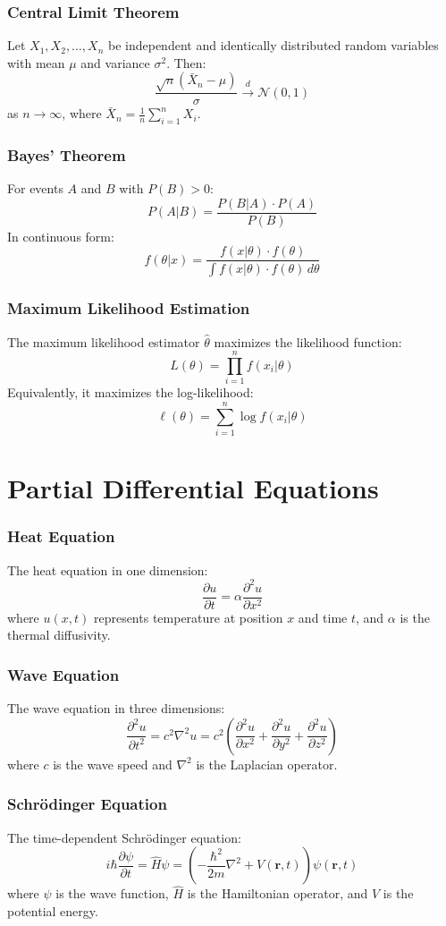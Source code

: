 \documentclass{beamer}
\begin{document}
\begin{frame}
\frametitle{Central Limit Theorem}
Let $X_1, X_2, \ldots, X_n$ be independent and identically distributed random variables with mean $\mu$ and variance $\sigma^2$. Then:
\[
\frac{\sqrt{n}(\bar{X}_n - \mu)}{\sigma} \xrightarrow{d} \mathcal{N}(0,1)
\]
as $n \to \infty$, where $\bar{X}_n = \frac{1}{n}\sum_{i=1}^n X_i$.
\end{frame}

\begin{frame}
\frametitle{Bayes' Theorem}
For events $A$ and $B$ with $P(B) > 0$:
\[
P(A|B) = \frac{P(B|A) \cdot P(A)}{P(B)}
\]
In continuous form:
\[
f(\theta|x) = \frac{f(x|\theta) \cdot f(\theta)}{\int f(x|\theta) \cdot f(\theta) \, d\theta}
\]
\end{frame}

\begin{frame}
\frametitle{Maximum Likelihood Estimation}
The maximum likelihood estimator $\hat{\theta}$ maximizes the likelihood function:
\[
L(\theta) = \prod_{i=1}^{n} f(x_i|\theta)
\]
Equivalently, it maximizes the log-likelihood:
\[
\ell(\theta) = \sum_{i=1}^{n} \log f(x_i|\theta)
\]
\end{frame}

\section{Partial Differential Equations}

\begin{frame}
\frametitle{Heat Equation}
The heat equation in one dimension:
\[
\frac{\partial u}{\partial t} = \alpha \frac{\partial^2 u}{\partial x^2}
\]
where $u(x,t)$ represents temperature at position $x$ and time $t$, and $\alpha$ is the thermal diffusivity.
\end{frame}

\begin{frame}
\frametitle{Wave Equation}
The wave equation in three dimensions:
\[
\frac{\partial^2 u}{\partial t^2} = c^2 \nabla^2 u = c^2 \left( \frac{\partial^2 u}{\partial x^2} + \frac{\partial^2 u}{\partial y^2} + \frac{\partial^2 u}{\partial z^2} \right)
\]
where $c$ is the wave speed and $\nabla^2$ is the Laplacian operator.
\end{frame}

\begin{frame}
\frametitle{Schrödinger Equation}
The time-dependent Schrödinger equation:
\[
i\hbar \frac{\partial \psi}{\partial t} = \hat{H} \psi = \left( -\frac{\hbar^2}{2m} \nabla^2 + V(\mathbf{r},t) \right) \psi(\mathbf{r},t)
\]
where $\psi$ is the wave function, $\hat{H}$ is the Hamiltonian operator, and $V$ is the potential energy.
\end{frame}
\end{document}
